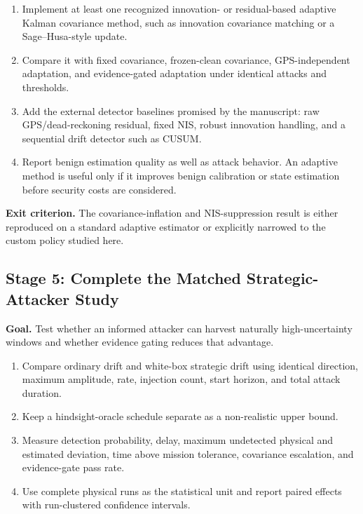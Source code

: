 \documentclass[11pt,a4paper]{article}
\begin{document}
\begin{enumerate}
    \item Implement at least one recognized innovation- or residual-based
    adaptive Kalman covariance method, such as innovation covariance matching
    or a Sage--Husa-style update.

    \item Compare it with fixed covariance, frozen-clean covariance,
    GPS-independent adaptation, and evidence-gated adaptation under identical
    attacks and thresholds.

    \item Add the external detector baselines promised by the manuscript:
    raw GPS/dead-reckoning residual, fixed NIS, robust innovation handling, and
    a sequential drift detector such as CUSUM.

    \item Report benign estimation quality as well as attack behavior. An
    adaptive method is useful only if it improves benign calibration or state
    estimation before security costs are considered.
\end{enumerate}

\textbf{Exit criterion.} The covariance-inflation and NIS-suppression result is
either reproduced on a standard adaptive estimator or explicitly narrowed to
the custom policy studied here.

\subsection{Stage 5: Complete the Matched Strategic-Attacker Study}

\textbf{Goal.} Test whether an informed attacker can harvest naturally
high-uncertainty windows and whether evidence gating reduces that advantage.

\begin{enumerate}
    \item Compare ordinary drift and white-box strategic drift using identical
    direction, maximum amplitude, rate, injection count, start horizon, and
    total attack duration.

    \item Keep a hindsight-oracle schedule separate as a non-realistic upper
    bound.

    \item Measure detection probability, delay, maximum undetected physical
    and estimated deviation, time above mission tolerance, covariance
    escalation, and evidence-gate pass rate.

    \item Use complete physical runs as the statistical unit and report paired
    effects with run-clustered confidence intervals.
\end{enumerate}
\end{document}
